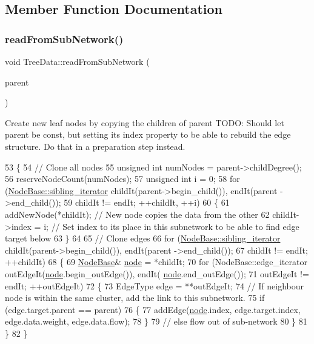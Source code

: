 \subsection{Member Function Documentation}
\mbox{\label{classTreeData_af7aed3b2d2c5149331e36dd98767d9ef}} 
\subsubsection{\texorpdfstring{read\+From\+Sub\+Network()}{readFromSubNetwork()}}
{\footnotesize\ttfamily void Tree\+Data\+::read\+From\+Sub\+Network (\begin{DoxyParamCaption}\item[{\mbox{\hyperlink{classNodeBase}{Node\+Base}} $\ast$}]{parent }\end{DoxyParamCaption})}

Create new leaf nodes by copying the children of {\ttfamily parent} T\+O\+DO\+: Should let parent be const, but setting its index property to be able to rebuild the edge structure. Do that in a preparation step instead. 
\begin{DoxyCode}
53 \{
54     \textcolor{comment}{// Clone all nodes}
55     \textcolor{keywordtype}{unsigned} \textcolor{keywordtype}{int} numNodes = parent->childDegree();
56     reserveNodeCount(numNodes);
57     \textcolor{keywordtype}{unsigned} \textcolor{keywordtype}{int} i = 0;
58     \textcolor{keywordflow}{for} (\mbox{\hyperlink{classSiblingIterator}{NodeBase::sibling\_iterator}} childIt(parent->begin\_child()), endIt(parent
      ->end\_child());
59             childIt != endIt; ++childIt, ++i)
60     \{
61         addNewNode(*childIt); \textcolor{comment}{// New node copies the data from the other}
62         childIt->index = i; \textcolor{comment}{// Set index to its place in this subnetwork to be able to find edge target
       below}
63     \}
64 
65     \textcolor{comment}{// Clone edges}
66     \textcolor{keywordflow}{for} (\mbox{\hyperlink{classSiblingIterator}{NodeBase::sibling\_iterator}} childIt(parent->begin\_child()), endIt(parent
      ->end\_child());
67             childIt != endIt; ++childIt)
68     \{
69         \mbox{\hyperlink{classNodeBase}{NodeBase}}& \mbox{\hyperlink{structnode}{node}} = *childIt;
70         \textcolor{keywordflow}{for} (NodeBase::edge\_iterator outEdgeIt(\mbox{\hyperlink{structnode}{node}}.begin\_outEdge()), endIt(
      \mbox{\hyperlink{structnode}{node}}.end\_outEdge());
71                 outEdgeIt != endIt; ++outEdgeIt)
72         \{
73             EdgeType edge = **outEdgeIt;
74             \textcolor{comment}{// If neighbour node is within the same cluster, add the link to this subnetwork.}
75             \textcolor{keywordflow}{if} (edge.target.parent == parent)
76             \{
77                 addEdge(\mbox{\hyperlink{structnode}{node}}.index, edge.target.index, edge.data.weight, edge.data.flow);
78             \}
79             \textcolor{comment}{// else flow out of sub-network}
80         \}
81     \}
82 \}
\end{DoxyCode}


